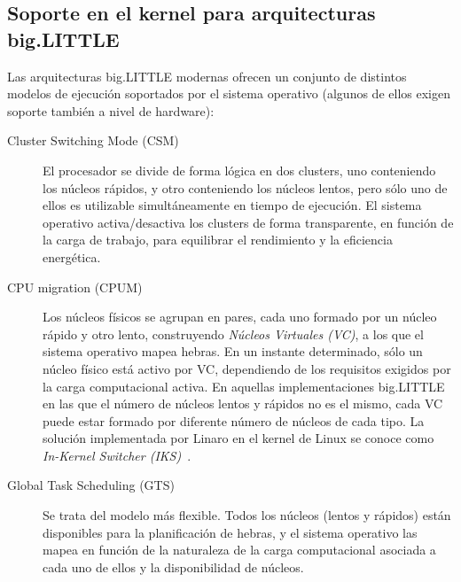 \subsection{Soporte en el kernel para arquitecturas big.LITTLE}
\label{sec:models}

Las arquitecturas big.LITTLE modernas ofrecen un conjunto de distintos modelos de ejecución
soportados por el sistema operativo (algunos de ellos exigen soporte también a nivel de
hardware):

\begin{description}

	\item[Cluster Switching Mode (CSM)]

El procesador se divide de forma lógica en dos clusters, uno conteniendo los núcleos
rápidos, y otro conteniendo los núcleos lentos, pero sólo uno de ellos es utilizable
simultáneamente en tiempo de ejecución. El sistema operativo activa/desactiva los 
clusters de forma transparente, en función de la carga de trabajo, para equilibrar
el rendimiento y la eficiencia energética.

\item[CPU migration (CPUM)] Los núcleos físicos se agrupan en pares, cada
  uno formado por un núcleo rápido y otro lento, construyendo {\em Núcleos
    Virtuales (VC)}, a los que el sistema operativo mapea hebras. En un
  instante determinado, sólo un núcleo físico está activo por VC,
  dependiendo de los requisitos exigidos por la carga computacional
  activa. En aquellas implementaciones big.LITTLE en las que el número de
  núcleos lentos y rápidos no es el mismo, cada VC puede estar formado por
  diferente número de núcleos de cada tipo. La solución implementada por
  Linaro en el kernel de Linux se conoce como {\em In-Kernel Switcher
    (IKS)}~\cite{iks}.

\item[Global Task Scheduling (GTS)] Se trata del modelo más flexible. Todos
  los núcleos (lentos y rápidos) están disponibles para la planificación de
  hebras, y el sistema operativo las mapea en función de la naturaleza de
  la carga computacional asociada a cada uno de ellos y la disponibilidad
  de núcleos.

\end{description}

